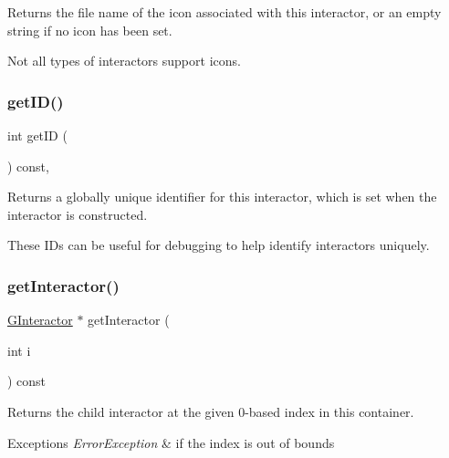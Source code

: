 Returns the file name of the icon associated with this interactor, or an empty string if no icon has been set. 

Not all types of interactors support icons. \mbox{\label{classsgl_1_1GInteractor_a9c9659a6c6ba66b4107ba59c95a24241}} 
\subsubsection{\texorpdfstring{get\+I\+D()}{getID()}}
{\footnotesize\ttfamily int get\+ID (\begin{DoxyParamCaption}{ }\end{DoxyParamCaption}) const\hspace{0.3cm}{\ttfamily [virtual]}, {\ttfamily [inherited]}}



Returns a globally unique identifier for this interactor, which is set when the interactor is constructed. 

These I\+Ds can be useful for debugging to help identify interactors uniquely. \mbox{\label{classsgl_1_1GContainer_ac59d7bae6154f6f8791c7f1fd856b157}} 
\subsubsection{\texorpdfstring{get\+Interactor()}{getInteractor()}}
{\footnotesize\ttfamily \mbox{\hyperlink{classsgl_1_1GInteractor}{G\+Interactor}} $\ast$ get\+Interactor (\begin{DoxyParamCaption}\item[{int}]{i }\end{DoxyParamCaption}) const\hspace{0.3cm}{\ttfamily [virtual]}}



Returns the child interactor at the given 0-\/based index in this container. 


\begin{DoxyExceptions}{Exceptions}
{\em Error\+Exception} & if the index is out of bounds \\
\hline
\end{DoxyExceptions}
\mbox{\label{classsgl_1_1GContainer_ad31230cd6d220466fbd18fd21d133f67}} 
